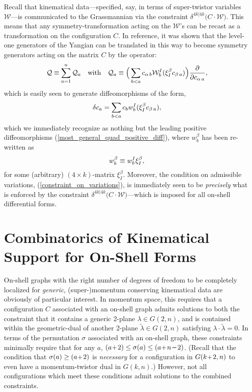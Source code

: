 \documentclass[12pt,hyperref,compress]{JHEP3}
\newcommand{\eq}[1]{\begin{equation}#1\end{equation}}
\newcommand{\mi}{{\rm\rule[2.4pt]{6pt}{0.65pt}}}
\newcommand{\pl}{\hspace{0.5pt}\text{{\small+}}\hspace{-0.5pt}}
\begin{document}
{Recall that kinematical data---specified, say, in terms of super-twistor variables $\mathcal{W}$---is communicated to the Grassmannian via the constraint $\delta^{4k|4k}\!\big(C\!\cdot\!\mathcal{W}\big)$. This means that any symmetry-transformation acting on the $\mathcal{W}$'s can be recast as a transformation on the configuration $C$. In reference\cite{Drummond:2010uq}, it was shown that the level-one generators of the Yangian can be translated in this way to become symmetry generators acting on the matrix $C$ by the operator:
\vspace{-.2cm}\eq{\mathcal{Q}\equiv\sum_{a=1}^{n}\mathcal{Q}_{a}\quad\mathrm{with}\quad \mathcal{Q}_{a}\equiv\Big(\sum_{b<a}c_{\alpha\,b}\mathcal{W}_b^{I}(\xi^{\beta}_{I}c_{\beta\,a})\Big)\frac{\partial}{\partial c_{\alpha\,a}}\vspace{-.2cm},}
which is easily seen to generate diffeomorphisms  of the form,
\vspace{-.2cm}\eq{\delta c_a=\sum_{b<a}c_bw_b^{I}(\xi^{\beta}_Ic_{\beta\,a}),\vspace{-.2cm}}
which we immediately recognize as nothing but the leading positive diffeomorphisms (\ref{most_general_quad_positive_diff}), where $w_b^{\beta}$ has been re-written as
\vspace{-.2cm}\eq{w_b^{\beta}\equiv w_b^I\xi_I^{\beta},\vspace{-.2cm}}
for some (arbitrary) $(4\!\times\!k)$-matrix $\xi_I^{\beta}$. Moreover, the condition on admissible variations, (\ref{constraint_on_variations}), is immediately seen to be {\it precisely} what is enforced by the constraint $\delta^{4k|4k}\big(C\!\cdot\!\mathcal{W}\big)$---which is imposed for all on-shell differential forms.









\newpage
\section{Combinatorics of Kinematical Support for On-Shell Forms}\label{kinematical_support_section}
On-shell graphs with the right number of degrees of freedom to be completely localized for {\it generic}, (super-)momentum conserving kinematical data are obviously of particular interest. In momentum space, this requires that a configuration $C$ associated with an on-shell graph admits solutions to both the constraint that it contains a generic 2-plane \mbox{$\lambda\!\in\!G(2,n)$}, and is contained within the geometric-dual of another 2-plane \mbox{$\widetilde{\lambda}\!\in\!G(2,n)$} satisfying $\lambda\!\cdot\!\widetilde\lambda=0$. In terms of the permutation $\sigma$ associated with an on-shell graph, these constraints minimally require that for any $a$, \mbox{$(a\pl\,2)\leq\sigma(a)\leq(a\pl\,n\,\mi\,2)$}. (Recall that the condition that $\sigma(a)\geq(a\pl\,2)$ is {\it necessary} for a configuration in $G(k\pl\,2,n)$ to even have a momentum-twistor dual in $G(k,n)$.) However, not all configurations which meet these conditions admit solutions to the combined constraints.


}
\end{document}
